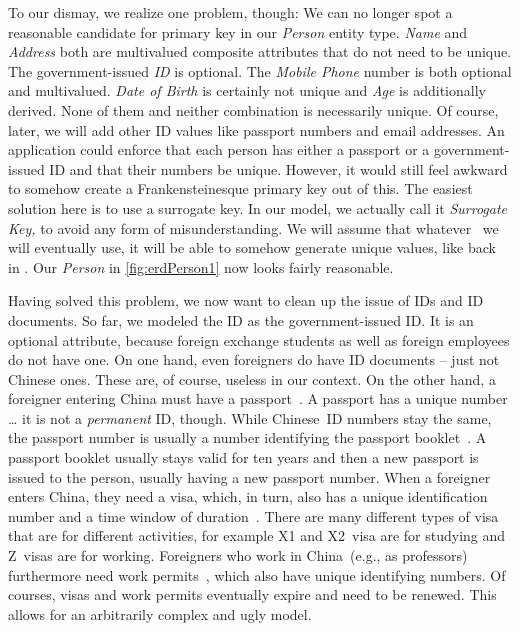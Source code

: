 To our dismay, we realize one problem, though:
We can no longer spot a reasonable candidate for primary key in our \emph{Person} entity type.
\emph{Name} and \emph{Address} both are multivalued composite attributes that do not need to be unique.
The government-issued \emph{ID} is optional.
The \emph{Mobile Phone} number is both optional and multivalued.
\emph{Date of Birth} is certainly not unique and \emph{Age} is additionally derived.
None of them and neither combination is necessarily unique.
Of course, later, we will add other ID values like passport numbers and email addresses.
An application could enforce that each person has either a passport or a government-issued ID and that their numbers be unique.
However, it would still feel awkward to somehow create a Frankensteinesque primary key out of this.
The easiest solution here is to use a surrogate key.
In our model, we actually call it \emph{Surrogate Key,} to avoid any form of misunderstanding.
We will assume that whatever \dbms\ we will eventually use, it will be able to somehow generate unique values, like back in .
Our \emph{Person} in \cref{fig:erdPerson1} now looks fairly reasonable.

Having solved this problem, we now want to clean up the issue of IDs and ID documents.
So far, we modeled the ID as the government-issued ID.
It is an optional attribute, because foreign exchange students as well as foreign employees do not have one.
On one hand, even foreigners do have ID documents -- just not Chinese ones.
These are, of course, useless in our context.
On the other hand, a foreigner entering China must have a passport~\cite{ICAO2021MRTDP3SCTAMEE}.
A passport has a unique number {\dots} it is not a \emph{permanent} ID, though.
While Chinese~ID numbers stay the same, the passport number is usually a number identifying the passport booklet~\cite{ICAO2004TAGOMRTDFMUOPINAPN}.
A passport booklet usually stays valid for ten years and then a new passport is issued to the person, usually having a new passport number.
When a foreigner enters China, they need a visa, which, in turn, also has a unique identification number and a time window of duration~\cite{CMOFA2019ITCV}.
There are many different types of visa that are for different activities, for example X1 and X2~visa are for studying and Z~visas are for working.
Foreigners who work in China~(e.g., as professors) furthermore need work permits~\cite{BD2006BDBK:WOFFITOROC}, which also have unique identifying numbers.
Of courses, visas and work permits eventually expire and need to be renewed.
This allows for an arbitrarily complex and ugly model.

